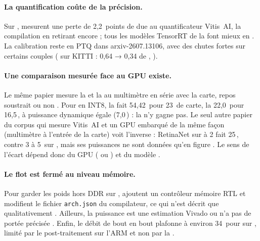 \paragraph{La quantification coûte de la précision.} Sur ,
\citet{arxiv-2304.11580-framework-benchmarking-real-time-embedded} mesurent une perte de
2,2~points de  due au quantificateur Vitis~AI, la compilation  en retirant encore ;
tous les modèles TensorRT de la  font mieux en  . La
calibration reste en PTQ dans arxiv-2607.13106, avec des chutes fortes sur certains couples
( sur KITTI : 0,64 → 0,34 de , ).

\paragraph{Une comparaison mesurée face au GPU existe.} Le même papier mesure la  et
la  au multimètre en série avec la carte, repos soustrait ou non . Pour
 en INT8, la  fait 54,42\, pour 23\, de carte, la  22,0\, pour
16,5\,, à puissance dynamique égale (7,0\,)  : la  n'y gagne pas. Le
seul autre papier du corpus qui mesure Vitis~AI et un GPU embarqué de la même façon
(multimètre à l'entrée de la carte) voit l'inverse : RetinaNet sur  à 2  fait
25\,, contre 3 à 5\, sur , mais ses puissances ne sont données qu'en figure
\citep[§2.5, §3, Fig.~12]{arxiv-2211.11647-benchmarking-edge-computing-devices-grape}.
Le sens de l'écart dépend donc du GPU ( ou ) et du modèle \deduit.

\paragraph{Le flot est fermé au niveau mémoire.} Pour garder les poids hors DDR sur ,
\citet{2026-fata-low-cost-fpga-enhanced-cnn} ajoutent un contrôleur mémoire RTL et
modifient le fichier \texttt{arch.json} du compilateur, ce qui n'est décrit que
qualitativement . Ailleurs, la puissance est une estimation Vivado
\citep[Table~III]{arxiv-2607.13106-no-attention-no-problem-dpu} ou n'a pas de portée
précisée \citep[§V-B]{2026-fata-low-cost-fpga-enhanced-cnn}. Enfin, le débit de bout en bout
plafonne à environ 34\, pour  sur , limité par le post-traitement sur
l'ARM et non par la  \citep[§IV-C]{arxiv-2607.13106-no-attention-no-problem-dpu}.

